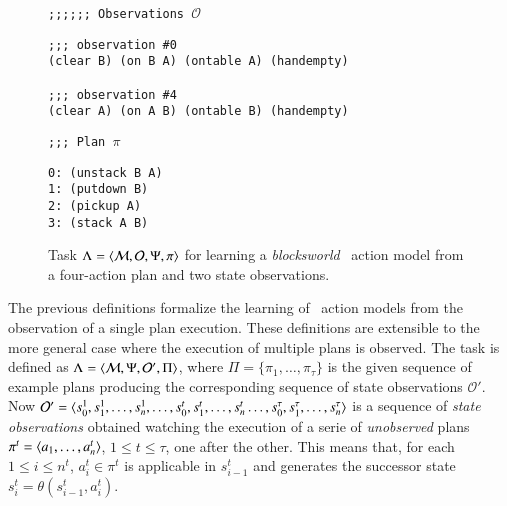 \begin{figure}[hbt!]
{\footnotesize\tt ;;;;;; Observations $\mathcal{O}$}
\begin{footnotesize}
\begin{verbatim}
;;; observation #0
(clear B) (on B A) (ontable A) (handempty)

;;; observation #4
(clear A) (on A B) (ontable B) (handempty)
\end{verbatim}
\end{footnotesize}

{\footnotesize\tt ;;; Plan $\pi$}
\begin{footnotesize}
\begin{verbatim}
0: (unstack B A)
1: (putdown B)
2: (pickup A)
3: (stack A B)
\end{verbatim}
\end{footnotesize}

 \caption{\small Task $\Lambda={\langle \mathcal{M},\mathcal{O},\Psi,\pi \rangle}$ for learning a {\em blocksworld} \strips\ action model from a four-action plan and two state observations.}
\label{fig:example-plans}
\end{figure}

The previous definitions formalize the learning of \strips\ action models from the observation of a single plan execution. These definitions are extensible to the more general case where the execution of multiple plans is observed. The task is defined as $\Lambda={\langle \mathcal{M},\Psi,\mathcal{O'},\Pi \rangle}$, where $\Pi=\{\pi_1,\ldots,\pi_{\tau}\}$ is the given sequence of example plans producing the corresponding sequence of state observations $\mathcal{O'}$. Now $\mathcal{O'}={\langle s_0^1,s_1^1,\ldots,s_{n}^1,\ldots,s_0^t,s_1^t,\ldots,s_{n}^t\ldots,s_0^{\tau},s_1^{\tau},\ldots,s_{n}^{\tau} \rangle}$ is a sequence of {\em state observations} obtained watching the execution of a serie of {\em unobserved} plans $\pi^t={\langle a_1, \ldots, a_n^t \rangle}$, {\tt\small $1\leq t\leq \tau$}, one after the other. This means that, for each {\small $1\leq i\leq n^t$}, $a_i^t\in \pi^t$ is applicable in $s_{i-1}^t$ and generates the successor state $s_i^t=\theta(s_{i-1}^t,a_i^t)$.


